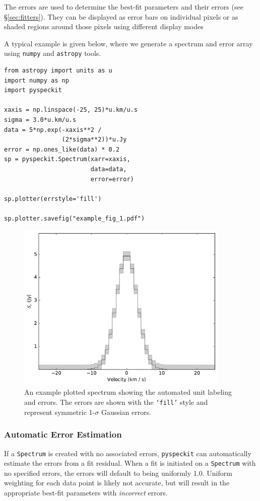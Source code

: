 \documentclass[twocolumn]{aastex62}
\newcommand{\pyspeckit}{\texttt{pyspeckit}\xspace}
\begin{document}
The errors are used to determine the best-fit parameters and their errors (see
\S \ref{sec:fitters}).  They can be displayed as error bars on individual
pixels or as shaded regions around those pixels using different display modes

A typical example is given below, where we generate a spectrum and error
array using \texttt{numpy} and \texttt{astropy} tools.

\vspace{2mm}
\begin{minipage}{\linewidth}
\begin{verbatim}
from astropy import units as u
import numpy as np
import pyspeckit

xaxis = np.linspace(-25, 25)*u.km/u.s
sigma = 3.0*u.km/u.s
data = 5*np.exp(-xaxis**2 /
                (2*sigma**2))*u.Jy
error = np.ones_like(data) * 0.2
sp = pyspeckit.Spectrum(xarr=xaxis,
                        data=data,
                        error=error)

sp.plotter(errstyle='fill')

sp.plotter.savefig("example_fig_1.pdf")
\end{verbatim}
\end{minipage}

\begin{figure}[!htp]
\includegraphics[scale=1,width=4in]{example_fig_1.pdf}
\caption{An example plotted spectrum showing the automated unit labeling
and errors.  The errors are shown with the \texttt{`fill'} style
and represent symmetric 1-$\sigma$ Gaussian errors.  }
\label{fig:example1}
\end{figure}




\subsubsection{Automatic Error Estimation}
If a \texttt{Spectrum} is created with no associated errors, \pyspeckit can
automatically estimate the errors from a fit residual. When a fit is initiated
on a \texttt{Spectrum} with no specified errors, the errors will default to
being uniformly 1.0. Uniform weighting for each data point is likely not
accurate, but will result in the appropriate best-fit parameters with
\emph{incorrect} errors.
\end{document}
